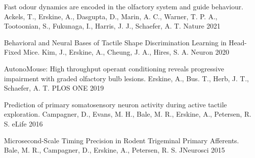 
\begin{cvhonors}

  \cvhonor
    {Fast odour dynamics are encoded in the olfactory system and guide behaviour.} %
    {Ackels, T., Erskine, A., Dasgupta, D., Marin, A. C., Warner, T. P. A., Tootoonian, S., Fukunaga, I., Harris, J. J., Schaefer, A. T.} %
    {Nature} %
    {2021} %

  \cvhonor
    {Behavioral and Neural Bases of Tactile Shape Discrimination Learning in Head-Fixed Mice.} %
    {Kim, J., Erskine, A., Cheung, J. A., Hires, S. A.} %
    {Neuron} %
    {2020} %

    \cvhonor
      {AutonoMouse: High throughput operant conditioning reveals progressive impairment with graded olfactory bulb lesions.} %
      {Erskine, A., Bus. T., Herb, J. T., Schaefer, A. T.} %
      {PLOS ONE} %
      {2019} %

  \cvhonor
    {Prediction of primary somatosensory neuron activity during active tactile exploration.} %
    {Campagner, D., Evans, M. H., Bale, M. R., Erskine, A., Petersen, R. S.} %
    {eLife} %
    {2016} %

  \cvhonor
    {Microsecond-Scale Timing Precision in Rodent Trigeminal Primary Afferents.} %
    {Bale, M. R., Campagner, D., Erskine, A., Petersen, R. S.} %
    {JNeurosci} %
    {2015} %

\end{cvhonors}